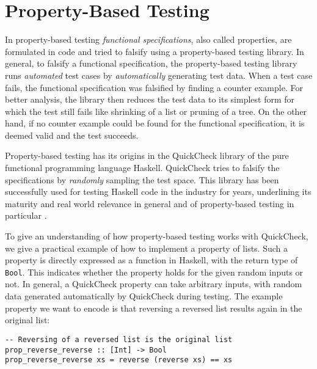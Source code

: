 \section{Property-Based Testing}
\label{sec:proptesting}
In property-based testing \textit{functional specifications}, also called properties, are formulated in code and tried to falsify using a property-based testing library. In general, to falsify a functional specification, the property-based testing library runs \textit{automated} test cases by \textit{automatically} generating test data. When a test case fails, the functional specification was falsified by finding a counter example. For better analysis, the library then reduces the test data to its simplest form for which the test still fails like shrinking of a list or pruning of a tree. On the other hand, if no counter example could be found for the functional specification, it is deemed valid and the test succeeds.

Property-based testing has its origins in the QuickCheck library \cite{claessen_quickcheck_2000,claessen_testing_2002} of the pure functional programming language Haskell. QuickCheck tries to falsify the specifications by \textit{randomly} sampling the test space. This library has been successfully used for testing Haskell code in the industry for years, underlining its maturity and real world relevance in general and of property-based testing in particular \cite{hughes_quickcheck_2007}.

To give an understanding of how property-based testing works with QuickCheck, we give a practical example of how to implement a property of lists. Such a property is directly expressed as a function in Haskell, with the return type of \texttt{Bool}. This indicates whether the property holds for the given random inputs or not. In general, a QuickCheck property can take arbitrary inputs, with random data generated automatically by QuickCheck during testing. The example property we want to encode is that reversing a reversed list results again in the original list:

\begin{footnotesize}
\begin{verbatim}
-- Reversing of a reversed list is the original list
prop_reverse_reverse :: [Int] -> Bool
prop_reverse_reverse xs = reverse (reverse xs) == xs
\end{verbatim}
\end{footnotesize}

